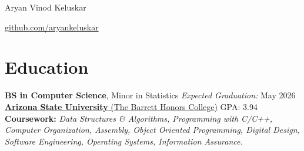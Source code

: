 \documentclass[11pt]{article}       %
\begin{document}
\centerline{\Huge Aryan Vinod Keluskar}

\vspace{5pt}

\centerline{  \color{black}{|}  \color{blue} \href{https://www.github.com/aryankeluskar}{github.com/aryankeluskar}  
}

\vspace{-10pt}


\section*{Education}

\textbf{BS in Computer Science}, Minor in Statistics \hfill \textit{Expected Graduation:} May 2026 \\
 \href{https://barretthonors.asu.edu/}{\textbf{Arizona State University} (The Barrett Honors College)} \hfill GPA: 3.94  \\
\textbf{Coursework:} \textit{Data Structures \& Algorithms, Programming with C/C++, Computer Organization, Assembly, Object Oriented Programming, Digital Design, Software Engineering, Operating Systems, Information Assurance.}

\vspace{-6.5pt}


\end{document}
